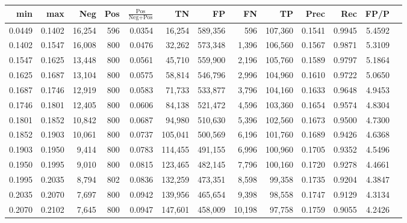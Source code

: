 \begin{tabular}{rrrrrrrrrrrrr}
\toprule
   min &    max &    Neg & Pos & $\frac{\text{Pos}}{\text{Neg}+\text{Pos}}$ &      TN &      FP &      FN &      TP &   Prec &    Rec &   FP/P \\
\midrule
0.0449 & 0.1402 & 16,254 & 596 &                                     0.0354 &  16,254 & 589,356 &     596 & 107,360 & 0.1541 & 0.9945 & 5.4592 \\
0.1402 & 0.1547 & 16,008 & 800 &                                     0.0476 &  32,262 & 573,348 &   1,396 & 106,560 & 0.1567 & 0.9871 & 5.3109 \\
0.1547 & 0.1625 & 13,448 & 800 &                                     0.0561 &  45,710 & 559,900 &   2,196 & 105,760 & 0.1589 & 0.9797 & 5.1864 \\
0.1625 & 0.1687 & 13,104 & 800 &                                     0.0575 &  58,814 & 546,796 &   2,996 & 104,960 & 0.1610 & 0.9722 & 5.0650 \\
0.1687 & 0.1746 & 12,919 & 800 &                                     0.0583 &  71,733 & 533,877 &   3,796 & 104,160 & 0.1633 & 0.9648 & 4.9453 \\
0.1746 & 0.1801 & 12,405 & 800 &                                     0.0606 &  84,138 & 521,472 &   4,596 & 103,360 & 0.1654 & 0.9574 & 4.8304 \\
0.1801 & 0.1852 & 10,842 & 800 &                                     0.0687 &  94,980 & 510,630 &   5,396 & 102,560 & 0.1673 & 0.9500 & 4.7300 \\
0.1852 & 0.1903 & 10,061 & 800 &                                     0.0737 & 105,041 & 500,569 &   6,196 & 101,760 & 0.1689 & 0.9426 & 4.6368 \\
0.1903 & 0.1950 &  9,414 & 800 &                                     0.0783 & 114,455 & 491,155 &   6,996 & 100,960 & 0.1705 & 0.9352 & 4.5496 \\
0.1950 & 0.1995 &  9,010 & 800 &                                     0.0815 & 123,465 & 482,145 &   7,796 & 100,160 & 0.1720 & 0.9278 & 4.4661 \\
0.1995 & 0.2035 &  8,794 & 802 &                                     0.0836 & 132,259 & 473,351 &   8,598 &  99,358 & 0.1735 & 0.9204 & 4.3847 \\
0.2035 & 0.2070 &  7,697 & 800 &                                     0.0942 & 139,956 & 465,654 &   9,398 &  98,558 & 0.1747 & 0.9129 & 4.3134 \\
0.2070 & 0.2102 &  7,645 & 800 &                                     0.0947 & 147,601 & 458,009 &  10,198 &  97,758 & 0.1759 & 0.9055 & 4.2426 \\

\end{tabular}
